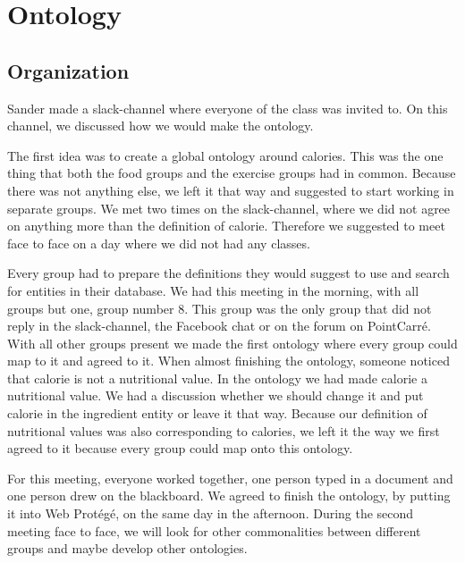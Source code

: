 

\maketitlepage
\section{Ontology}
\subsection{Organization}
Sander made a slack-channel where everyone of the class was invited to. On this channel, we discussed how we would make the ontology. 

The first idea was to create a global ontology around calories. This was the one thing that both the food groups and the exercise groups had in common. Because there was not anything else, we left it that way and suggested to start working in separate groups. 
We met two times on the slack-channel, where we did not agree on anything more than the definition of calorie. Therefore we suggested to meet face to face on a day where we did not had any classes. 

Every group had to prepare the definitions they would suggest to use and search for entities in their database. We had this meeting in the morning, with all groups but one, group number 8. This group was the only group that did not reply in the slack-channel, the Facebook chat or on the forum on PointCarré. With all other groups present we made the first ontology where every group could map to it and agreed to it. When almost finishing the ontology, someone noticed that calorie is not a nutritional value. In the ontology we had made calorie a nutritional value. We had a discussion whether we should change it and put calorie in the ingredient entity or leave it that way. Because our definition of nutritional values was also corresponding to calories, we left it the way we first agreed to it because every group could map onto this ontology. 

For this meeting, everyone worked together, one person typed in a document and one person drew on the blackboard. We agreed to finish the ontology, by putting it into Web Protégé, on the same day in the afternoon. During the second meeting face to face, we will look for other commonalities between different groups and maybe develop other ontologies.

